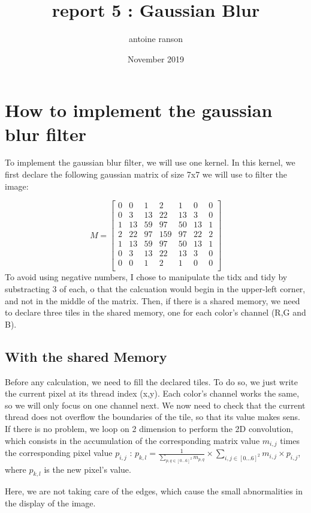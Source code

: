 \documentclass{article}
\title{report 5 : Gaussian Blur}
\author{antoine ranson }
\date{November 2019}
\begin{document}
 

\maketitle 

\section{How to implement the gaussian blur filter} To implement the gaussian blur filter, we will use one kernel. In this kernel, we first declare the following gaussian matrix of size 7x7 we will use to filter the image: \newline
 
\[
   M=
  \left[ {\begin{array}{ccccccc}
   0 & 0 & 1 & 2 & 1 & 0 & 0 \\
   0 & 3 & 13 & 22 & 13 & 3 & 0 \\
   1 & 13 & 59 & 97 & 50 & 13 & 1\\
   2 & 22 & 97 & 159 & 97 & 22 & 2\\
   1 & 13 & 59 & 97 & 50 & 13 & 1\\
   0 & 3 & 13 & 22 & 13 & 3 & 0 \\
   0 & 0 & 1 & 2 & 1 & 0 & 0 \\
  \end{array} } \right] \] \newline 
To avoid using negative numbers, I chose to manipulate the tidx and tidy by 
substracting 3 of each, o that the calcuation would begin in the upper-left corner, and not in the middle of the 
matrix. Then, if there is a shared memory, we need to declare three tiles in the shared memory, one for each 
color's channel (R,G and B). 

\subsection{With the shared Memory} 
Before any calculation, we need to fill the 
declared tiles. To do so, we just write the current pixel at its thread index (x,y). Each color's channel works 
the same, so we will only focus on one channel next. We now need to check that the current thread does not 
overflow the boundaries of the tile, so that its value makes sens. If there is no problem, we loop on 2 
dimension to perform the 2D convolution, which consists in the accumulation of the corresponding matrix value 
$m_{i,j}$ times the corresponding pixel value $p_{i,j} $ : 
$p_{k,l} = \displaystyle\frac{1}{\displaystyle\sum_{p,q\in [0...6]^2} m_{p,q}} \times \displaystyle\sum_{i,j\in [0...6]^2} m_{i,j}\times p_{i,j}$, 
where $p_{k,l}$ is the new pixel's value. 

Here, we are not taking care of the edges, which cause the small abnormalities in the display of the image.
\end{document}
